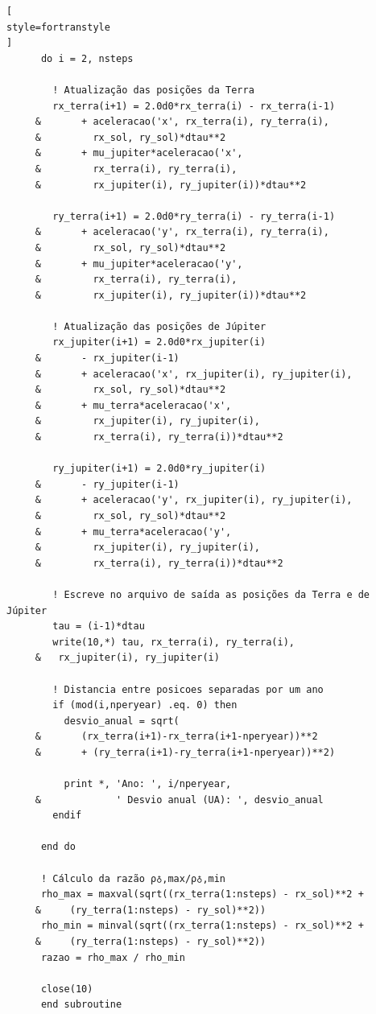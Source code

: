 \documentclass[12pt,a4paper]{article}
\begin{document}
\begin{lstlisting}[
style=fortranstyle
]
      do i = 2, nsteps

        ! Atualização das posições da Terra
        rx_terra(i+1) = 2.0d0*rx_terra(i) - rx_terra(i-1)
     &       + aceleracao('x', rx_terra(i), ry_terra(i),
     &         rx_sol, ry_sol)*dtau**2
     &       + mu_jupiter*aceleracao('x',
     &         rx_terra(i), ry_terra(i),
     &         rx_jupiter(i), ry_jupiter(i))*dtau**2

        ry_terra(i+1) = 2.0d0*ry_terra(i) - ry_terra(i-1)
     &       + aceleracao('y', rx_terra(i), ry_terra(i),
     &         rx_sol, ry_sol)*dtau**2
     &       + mu_jupiter*aceleracao('y',
     &         rx_terra(i), ry_terra(i),
     &         rx_jupiter(i), ry_jupiter(i))*dtau**2

        ! Atualização das posições de Júpiter
        rx_jupiter(i+1) = 2.0d0*rx_jupiter(i)
     &       - rx_jupiter(i-1)
     &       + aceleracao('x', rx_jupiter(i), ry_jupiter(i),
     &         rx_sol, ry_sol)*dtau**2
     &       + mu_terra*aceleracao('x',
     &         rx_jupiter(i), ry_jupiter(i),
     &         rx_terra(i), ry_terra(i))*dtau**2

        ry_jupiter(i+1) = 2.0d0*ry_jupiter(i)
     &       - ry_jupiter(i-1)
     &       + aceleracao('y', rx_jupiter(i), ry_jupiter(i),
     &         rx_sol, ry_sol)*dtau**2
     &       + mu_terra*aceleracao('y',
     &         rx_jupiter(i), ry_jupiter(i),
     &         rx_terra(i), ry_terra(i))*dtau**2

        ! Escreve no arquivo de saída as posições da Terra e de Júpiter
        tau = (i-1)*dtau
        write(10,*) tau, rx_terra(i), ry_terra(i), 
     &   rx_jupiter(i), ry_jupiter(i)

        ! Distancia entre posicoes separadas por um ano
        if (mod(i,nperyear) .eq. 0) then
          desvio_anual = sqrt(
     &       (rx_terra(i+1)-rx_terra(i+1-nperyear))**2
     &       + (ry_terra(i+1)-ry_terra(i+1-nperyear))**2)

          print *, 'Ano: ', i/nperyear,
     &             ' Desvio anual (UA): ', desvio_anual
        endif

      end do

      ! Cálculo da razão ρ♁,max/ρ♁,min
      rho_max = maxval(sqrt((rx_terra(1:nsteps) - rx_sol)**2 + 
     &     (ry_terra(1:nsteps) - ry_sol)**2))
      rho_min = minval(sqrt((rx_terra(1:nsteps) - rx_sol)**2 + 
     &     (ry_terra(1:nsteps) - ry_sol)**2))
      razao = rho_max / rho_min

      close(10)
      end subroutine



\end{lstlisting}
\end{document}
